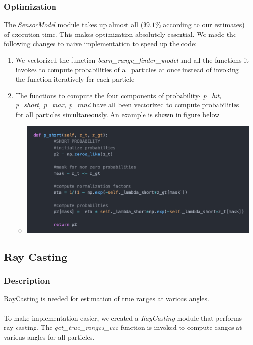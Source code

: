 \documentclass[12pt, a4paper]{article}
\begin{document}
\subsubsection{Optimization}
The \textit{SensorModel} module takes up almost all ($99.1\%$ according to our estimates) of execution time. This makes optimization absolutely essential. We made the following changes to naive implementation to speed up the code:
\begin{enumerate}
  \item We vectorized the function \textit{beam\_range\_finder\_model} and all the functions it invokes to compute probabilities of all particles at once instead of invoking the function iteratively for each particle
  \item The functions to compute the four components of probability- \textit{p\_hit, p\_short, p\_max, p\_rand} have all been vectorized to compute probabilities for all particles simultaneously. An example is shown in figure below
  \begin{itemize}
    \item 
    \begin{minipage}[t]{\linewidth}
      \vspace{0pt}
      \begin{center}
        \includegraphics[scale=0.3]{./results/sensor_model_opt.png}
        \label{fig:sm_1}
      \end{center}
    \end{minipage}
  \end{itemize}
\end{enumerate}
\subsection{Ray Casting}
\subsubsection{Description}
RayCasting is needed for estimation of true ranges at various angles.\\\\ 
To make implementation easier, we created a \textit{RayCasting} module that performs ray casting. The \textit{get\_true\_ranges\_vec} function is invoked to compute ranges at various angles for all particles.
\end{document}
